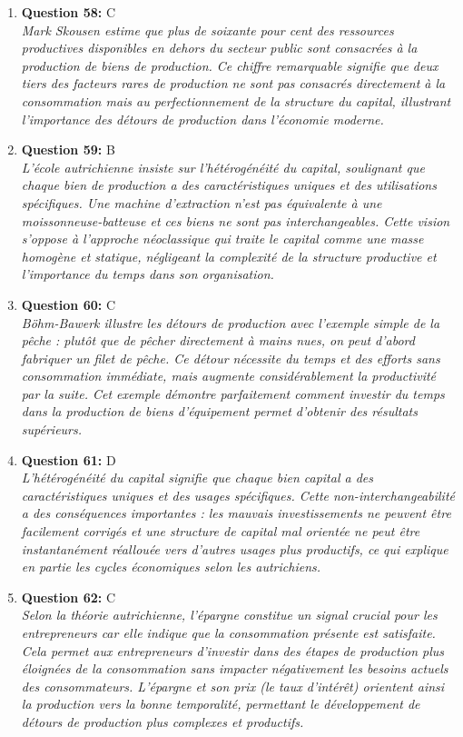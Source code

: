 \documentclass[12pt,a4paper]{article}
\begin{document}
\begin{enumerate}
\item \textbf{Question 58:} C
\\ \textit{Mark Skousen estime que plus de soixante pour cent des ressources productives disponibles en dehors du secteur public sont consacrées à la production de biens de production. Ce chiffre remarquable signifie que deux tiers des facteurs rares de production ne sont pas consacrés directement à la consommation mais au perfectionnement de la structure du capital, illustrant l'importance des détours de production dans l'économie moderne.}

\item \textbf{Question 59:} B
\\ \textit{L'école autrichienne insiste sur l'hétérogénéité du capital, soulignant que chaque bien de production a des caractéristiques uniques et des utilisations spécifiques. Une machine d'extraction n'est pas équivalente à une moissonneuse-batteuse et ces biens ne sont pas interchangeables. Cette vision s'oppose à l'approche néoclassique qui traite le capital comme une masse homogène et statique, négligeant la complexité de la structure productive et l'importance du temps dans son organisation.}

\item \textbf{Question 60:} C
\\ \textit{Böhm-Bawerk illustre les détours de production avec l'exemple simple de la pêche : plutôt que de pêcher directement à mains nues, on peut d'abord fabriquer un filet de pêche. Ce détour nécessite du temps et des efforts sans consommation immédiate, mais augmente considérablement la productivité par la suite. Cet exemple démontre parfaitement comment investir du temps dans la production de biens d'équipement permet d'obtenir des résultats supérieurs.}

\item \textbf{Question 61:} D
\\ \textit{L'hétérogénéité du capital signifie que chaque bien capital a des caractéristiques uniques et des usages spécifiques. Cette non-interchangeabilité a des conséquences importantes : les mauvais investissements ne peuvent être facilement corrigés et une structure de capital mal orientée ne peut être instantanément réallouée vers d'autres usages plus productifs, ce qui explique en partie les cycles économiques selon les autrichiens.}

\item \textbf{Question 62:} C
\\ \textit{Selon la théorie autrichienne, l'épargne constitue un signal crucial pour les entrepreneurs car elle indique que la consommation présente est satisfaite. Cela permet aux entrepreneurs d'investir dans des étapes de production plus éloignées de la consommation sans impacter négativement les besoins actuels des consommateurs. L'épargne et son prix (le taux d'intérêt) orientent ainsi la production vers la bonne temporalité, permettant le développement de détours de production plus complexes et productifs.}


\end{enumerate}
\end{document}
